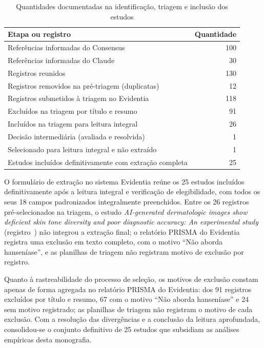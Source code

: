 \begin{table}[htb]
\centering
\caption{Quantidades documentadas na identificação, triagem e inclusão dos estudos}
\label{tab:fluxo-selecao-estudos}
\begin{tabular}{p{} r}
\toprule
Etapa ou registro & Quantidade \\
\midrule
Referências informadas do Consensus & 100 \\
Referências informadas do Claude & 30 \\
Registros reunidos & 130 \\
Registros removidos na pré-triagem (duplicatas) & 12 \\
Registros submetidos à triagem no Evidentia & 118 \\
Excluídos na triagem por título e resumo & 91 \\
Incluídos na triagem para leitura integral & 26 \\
Decisão intermediária (avaliada e resolvida) & 1 \\
Selecionado para leitura integral e não extraído & 1 \\
Estudos incluídos definitivamente com extração completa & 25 \\
\bottomrule
\end{tabular}
\end{table}

O formulário de extração no sistema Evidentia reúne os 25 estudos incluídos
definitivamente após a leitura integral e verificação de elegibilidade, com todos os seus
18 campos padronizados integralmente preenchidos. Entre os 26 registros pré-selecionados na
triagem, o estudo \textit{AI-generated dermatologic images show deficient skin tone
diversity and poor diagnostic accuracy: An experimental study} (registro~) não
integrou a extração final; o relatório PRISMA do Evidentia registra uma exclusão em texto completo, com o
motivo ``Não aborda hanseníase'', e as planilhas de triagem não registram motivo de exclusão por registro.

Quanto à rastreabilidade do processo de seleção, os motivos de exclusão constam apenas de forma agregada no
relatório PRISMA do Evidentia: dos 91 registros excluídos por título e resumo, 67 com o motivo
``Não aborda hanseníase'' e 24 sem motivo registrado; as planilhas de triagem não registram o motivo de
cada exclusão. Com a resolução das divergências e a conclusão
da leitura aprofundada, consolidou-se o conjunto definitivo de 25 estudos que subsidiam
as análises empíricas desta monografia.

